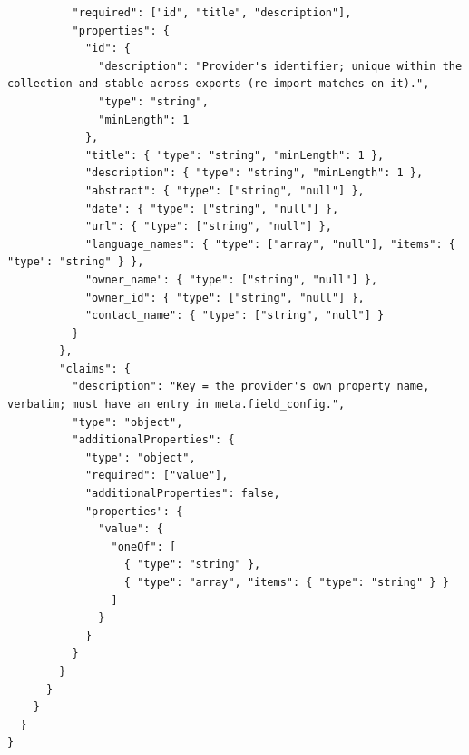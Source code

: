 \documentclass{scrartcl}
\begin{document}
\begin{verbatim}
          "required": ["id", "title", "description"],
          "properties": {
            "id": {
              "description": "Provider's identifier; unique within the collection and stable across exports (re-import matches on it).",
              "type": "string",
              "minLength": 1
            },
            "title": { "type": "string", "minLength": 1 },
            "description": { "type": "string", "minLength": 1 },
            "abstract": { "type": ["string", "null"] },
            "date": { "type": ["string", "null"] },
            "url": { "type": ["string", "null"] },
            "language_names": { "type": ["array", "null"], "items": { "type": "string" } },
            "owner_name": { "type": ["string", "null"] },
            "owner_id": { "type": ["string", "null"] },
            "contact_name": { "type": ["string", "null"] }
          }
        },
        "claims": {
          "description": "Key = the provider's own property name, verbatim; must have an entry in meta.field_config.",
          "type": "object",
          "additionalProperties": {
            "type": "object",
            "required": ["value"],
            "additionalProperties": false,
            "properties": {
              "value": {
                "oneOf": [
                  { "type": "string" },
                  { "type": "array", "items": { "type": "string" } }
                ]
              }
            }
          }
        }
      }
    }
  }
}
\end{verbatim}
\end{document}
